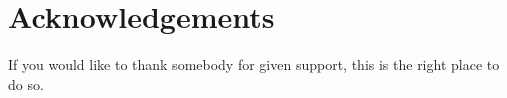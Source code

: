 \chapter*{Acknowledgements}


If you would like to thank somebody for given support, this is the right place to do so.